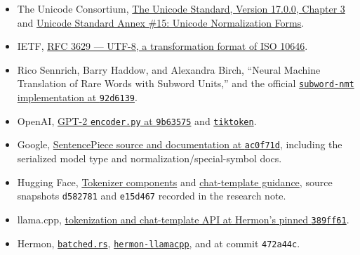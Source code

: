 \begin{itemize}
\tightlist
\item
  The Unicode Consortium,
  \href{https://www.unicode.org/versions/Unicode17.0.0/core-spec/chapter-3/}{The
  Unicode Standard, Version 17.0.0, Chapter 3} and
  \href{https://www.unicode.org/reports/tr15/}{Unicode Standard Annex
  \#15: Unicode Normalization Forms}.
\item
  IETF, \href{https://www.rfc-editor.org/rfc/rfc3629}{RFC 3629 ---
  UTF-8, a transformation format of ISO 10646}.
\item
  Rico Sennrich, Barry Haddow, and Alexandra Birch, ``Neural Machine
  Translation of Rare Words with Subword Units,'' and the official
  \href{https://github.com/rsennrich/subword-nmt/tree/92d6139d07d30e12735a0af9e7f7f925ebe62c54}{\texttt{subword-nmt}
  implementation at \texttt{92d6139}}.
\item
  OpenAI,
  \href{https://github.com/openai/gpt-2/blob/9b63575ef42771a015060c964af2c3da4cf7c8ab/src/encoder.py}{GPT-2
  \texttt{encoder.py} at \texttt{9b63575}} and
  \href{https://github.com/openai/tiktoken}{\texttt{tiktoken}}.
\item
  Google,
  \href{https://github.com/google/sentencepiece/tree/ac0f71dcbc85f94292266e55bf6cee1b4d6c9dc1}{SentencePiece
  source and documentation at \texttt{ac0f71d}}, including the
  serialized model type and normalization/special-symbol docs.
\item
  Hugging Face,
  \href{https://huggingface.co/docs/tokenizers/components}{Tokenizer
  components} and
  \href{https://huggingface.co/docs/transformers/chat_templating}{chat-template
  guidance}, source snapshots \texttt{d582781} and \texttt{e15d467}
  recorded in the research note.
\item
  llama.cpp,
  \href{https://github.com/ggml-org/llama.cpp/blob/389ff61d77b5c71cec0cf92fe4e5d01ace80b797/include/llama.h}{tokenization
  and chat-template API at Hermon's pinned \texttt{389ff61}}.
\item
  Hermon,
  \href{https://github.com/hermonai/hermon/blob/472a44cdb511b2dae6c9569e59543db8f8350b25/crates/hermon-runtime/src/batched.rs}{\texttt{batched.rs}},
  \href{https://github.com/hermonai/hermon/blob/472a44cdb511b2dae6c9569e59543db8f8350b25/crates/hermon-llamacpp/src/linked.rs}{\texttt{hermon-llamacpp}},
  and
  \href{https://github.com/hermonai/hermon/blob/472a44cdb511b2dae6c9569e59543db8f8350b25/crates/hermon-tokenizer/src/lib.rs}{\texttt{}}
  at commit \texttt{472a44c}.
\end{itemize}




